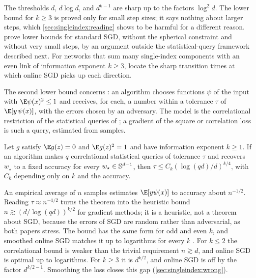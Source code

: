 \begin{refsection}
The thresholds $d$, $d\log d$, and $d^{k-1}$ are sharp up to the factors $\log^2d$. The lower bound for $k\ge3$ is proved only for small step sizes; it says nothing about larger steps, which \cref{sec:singleindex:reading} shows to be harmful for a different reason. \Textcite{BarzilaiShamir2026} prove lower bounds for standard SGD, without the spherical constraint and without very small steps, by an argument outside the statistical-query framework described next. For networks that sum many single-index components with an even link of information exponent $k\ge3$, \textcite{RenEtAl2025} locate the sharp transition times at which online SGD picks up each direction.

The second lower bound concerns : an algorithm chooses functions $\psi$ of the input with $\E\psi(x)^2\le1$ and receives, for each, a number within a tolerance $\tau$ of $\E[y\,\psi(x)]$, with the errors chosen by an adversary. The model is the correlational restriction \parencite{BshoutyFeldman2002} of the statistical queries of \textcite{Kearns1998}; a gradient of the square or correlation loss is such a query, estimated from samples.

\begin{theorem}\label{thm:singleindex:csq}
Let $g$ satisfy $\E g(z)=0$ and $\E g(z)^2=1$ and have information exponent $k\ge1$. If an algorithm makes $q$ correlational statistical queries of tolerance $\tau$ and recovers $w_\star$ to a fixed accuracy for every $w_\star\in\mathbb{S}^{d-1}$, then $\tau\le C_k(\log(qd)/d)^{k/4}$, with $C_k$ depending only on $k$ and the accuracy.
\end{theorem}

An empirical average of $n$ samples estimates $\E[y\psi(x)]$ to accuracy about $n^{-1/2}$. Reading $\tau\approx n^{-1/2}$ turns the theorem into the heuristic bound $n\gtrsim(d/\log(qd))^{k/2}$ for gradient methods; it is a heuristic, not a theorem about SGD, because the errors of SGD are random rather than adversarial, as both papers stress. The bound has the same form for odd and even $k$, and smoothed online SGD matches it up to logarithms for every $k$ \parencite{DamianEtAl2023}. For $k\le2$ the correlational bound is weaker than the trivial requirement $n\gtrsim d$, and online SGD is optimal up to logarithms. For $k\ge3$ it is $d^{k/2}$, and online SGD is off by the factor $d^{k/2-1}$. Smoothing the loss closes this gap (\cref{sec:singleindex:wrong}).


\end{refsection}
